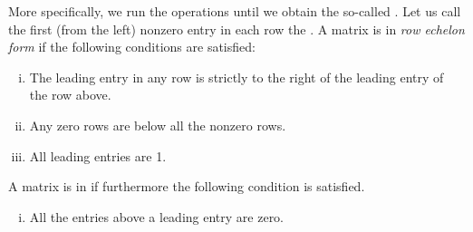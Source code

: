 More specifically, we run the operations until we obtain the so-called
\emph{}.
Let us call
the first (from the left) nonzero entry in each row the
\emph{}.  
A matrix is in \emph{row echelon form} if
the following conditions are satisfied:
\begin{enumerate}[(i)]
\item The leading entry in any row is strictly to the right of
the leading entry of the row above.
\item Any zero rows are below all the nonzero rows.
\item All leading entries are 1.
\end{enumerate}
A matrix is in \emph{}
if furthermore the following condition is satisfied.
\begin{enumerate}[(i),resume]
\item All the entries above a leading entry are zero.
\end{enumerate}

